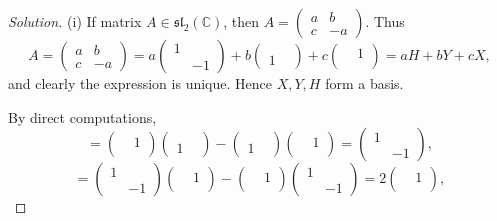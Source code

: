 \documentclass{article}
\theoremstyle{definition}
\theoremstyle{plain}
\begin{document}
\begin{adjustwidth}{0.7cm}{}
\color{blue}
\begin{proof}[Solution]
(i) If matrix $A\in\mathfrak{sl}_2(\mathbb{C})$, then $A=\begin{pmatrix}a&b\\ c&-a\end{pmatrix}$. Thus
\begin{displaymath}
A=\begin{pmatrix}a&b\\ c&-a\end{pmatrix}=a\begin{pmatrix}1&\\ &-1\end{pmatrix}+b\begin{pmatrix}&\\ 1&\end{pmatrix}+c\begin{pmatrix}&1\\ &\end{pmatrix}=aH+bY+cX,
\end{displaymath}
and clearly the expression is unique. Hence $X,Y,H$ form a basis.\par
By direct computations,
\begin{displaymath}
[X,Y]=\begin{pmatrix}&1\\ &\end{pmatrix}\begin{pmatrix}&\\ 1&\end{pmatrix}-\begin{pmatrix}&\\ 1&\end{pmatrix}\begin{pmatrix}&1\\ &\end{pmatrix}=\begin{pmatrix}1&\\ &-1\end{pmatrix},
\end{displaymath}
\begin{displaymath}
[H,X]=\begin{pmatrix}1&\\ &-1\end{pmatrix}\begin{pmatrix}&1\\ &\end{pmatrix}-\begin{pmatrix}&1\\ &\end{pmatrix}\begin{pmatrix}1&\\ &-1\end{pmatrix}=2\begin{pmatrix}&1\\ &\end{pmatrix},

\end{displaymath}
\end{proof}
\end{adjustwidth}
\end{document}
